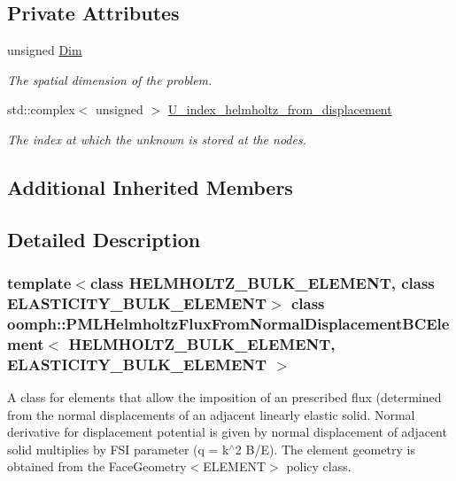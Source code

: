\subsection*{Private Attributes}
\begin{DoxyCompactItemize}
\item 
unsigned \hyperlink{classoomph_1_1PMLHelmholtzFluxFromNormalDisplacementBCElement_a61904b123c934fd59b5c72f626ebb728}{Dim}
\begin{DoxyCompactList}\small\item\em The spatial dimension of the problem. \end{DoxyCompactList}\item 
std\+::complex$<$ unsigned $>$ \hyperlink{classoomph_1_1PMLHelmholtzFluxFromNormalDisplacementBCElement_aa80b2b79bd3c63f8d7c7f91d97fd22fc}{U\+\_\+index\+\_\+helmholtz\+\_\+from\+\_\+displacement}
\begin{DoxyCompactList}\small\item\em The index at which the unknown is stored at the nodes. \end{DoxyCompactList}\end{DoxyCompactItemize}
\subsection*{Additional Inherited Members}


\subsection{Detailed Description}
\subsubsection*{template$<$class H\+E\+L\+M\+H\+O\+L\+T\+Z\+\_\+\+B\+U\+L\+K\+\_\+\+E\+L\+E\+M\+E\+NT, class E\+L\+A\+S\+T\+I\+C\+I\+T\+Y\+\_\+\+B\+U\+L\+K\+\_\+\+E\+L\+E\+M\+E\+NT$>$\newline
class oomph\+::\+P\+M\+L\+Helmholtz\+Flux\+From\+Normal\+Displacement\+B\+C\+Element$<$ H\+E\+L\+M\+H\+O\+L\+T\+Z\+\_\+\+B\+U\+L\+K\+\_\+\+E\+L\+E\+M\+E\+N\+T, E\+L\+A\+S\+T\+I\+C\+I\+T\+Y\+\_\+\+B\+U\+L\+K\+\_\+\+E\+L\+E\+M\+E\+N\+T $>$}

A class for elements that allow the imposition of an prescribed flux (determined from the normal displacements of an adjacent linearly elastic solid. Normal derivative for displacement potential is given by normal displacement of adjacent solid multiplies by F\+SI parameter (q = k$^\wedge$2 B/E). The element geometry is obtained from the Face\+Geometry$<$\+E\+L\+E\+M\+E\+N\+T$>$ policy class. 


